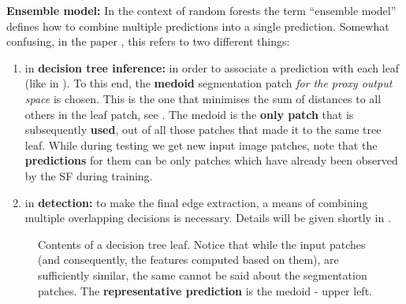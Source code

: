 \textbf{Ensemble model:} In the context of random forests the term ``ensemble model'' defines how to combine multiple predictions into a single prediction. Somewhat confusing, in the paper \cite{DollarICCV13edges}, this refers to two different things:
\begin{enumerate}
 \item{in {\bf decision tree inference:}} in order to associate a prediction with each leaf (like in ). 
 To this end, the {\bf medoid} segmentation patch \textit{for the proxy output space} is chosen. This is the one that minimises the sum of distances to all others in the leaf patch, see . The medoid is the {\bf only patch} that is subsequently {\bf used}, out of all those patches that made it to the same tree leaf. 
 While during testing we get new input image patches, note that the {\bf predictions} for them can be only patches which have already been observed by the SF during training. %
 \item{in {\bf detection:}} to make the final edge extraction, a means of combining multiple overlapping decisions is necessary. Details will be given shortly in .
\end{enumerate}

\begin{figure}[ht!]
\centering
\caption{Contents of a decision tree leaf. Notice that while the input patches (and consequently, the features computed based on them), are sufficiently similar, the same cannot be said about the segmentation patches. The {\bf representative prediction} is the medoid - upper left.}
\label{fig:srf-leaf}
\end{figure}

